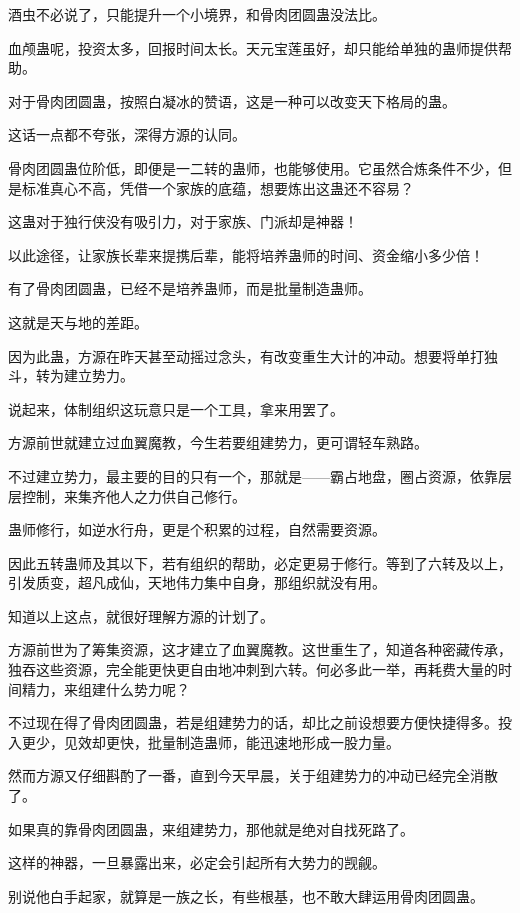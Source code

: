 \begin{this_body}
酒虫不必说了，只能提升一个小境界，和骨肉团圆蛊没法比。

血颅蛊呢，投资太多，回报时间太长。天元宝莲虽好，却只能给单独的蛊师提供帮助。

对于骨肉团圆蛊，按照白凝冰的赞语，这是一种可以改变天下格局的蛊。

这话一点都不夸张，深得方源的认同。

骨肉团圆蛊位阶低，即便是一二转的蛊师，也能够使用。它虽然合炼条件不少，但是标准真心不高，凭借一个家族的底蕴，想要炼出这蛊还不容易？

这蛊对于独行侠没有吸引力，对于家族、门派却是神器！

以此途径，让家族长辈来提携后辈，能将培养蛊师的时间、资金缩小多少倍！

有了骨肉团圆蛊，已经不是培养蛊师，而是批量制造蛊师。

这就是天与地的差距。

因为此蛊，方源在昨天甚至动摇过念头，有改变重生大计的冲动。想要将单打独斗，转为建立势力。

说起来，体制组织这玩意只是一个工具，拿来用罢了。

方源前世就建立过血翼魔教，今生若要组建势力，更可谓轻车熟路。

不过建立势力，最主要的目的只有一个，那就是——霸占地盘，圈占资源，依靠层层控制，来集齐他人之力供自己修行。

蛊师修行，如逆水行舟，更是个积累的过程，自然需要资源。

因此五转蛊师及其以下，若有组织的帮助，必定更易于修行。等到了六转及以上，引发质变，超凡成仙，天地伟力集中自身，那组织就没有用。

知道以上这点，就很好理解方源的计划了。

方源前世为了筹集资源，这才建立了血翼魔教。这世重生了，知道各种密藏传承，独吞这些资源，完全能更快更自由地冲刺到六转。何必多此一举，再耗费大量的时间精力，来组建什么势力呢？

不过现在得了骨肉团圆蛊，若是组建势力的话，却比之前设想要方便快捷得多。投入更少，见效却更快，批量制造蛊师，能迅速地形成一股力量。

然而方源又仔细斟酌了一番，直到今天早晨，关于组建势力的冲动已经完全消散了。

如果真的靠骨肉团圆蛊，来组建势力，那他就是绝对自找死路了。

这样的神器，一旦暴露出来，必定会引起所有大势力的觊觎。

别说他白手起家，就算是一族之长，有些根基，也不敢大肆运用骨肉团圆蛊。


\end{this_body}
